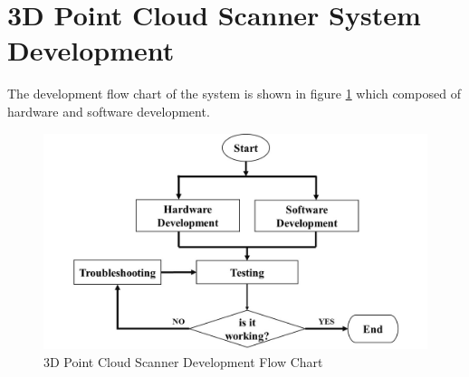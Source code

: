 \section{3D Point Cloud Scanner System Development}

The development flow chart of the system is shown in figure \ref{ch3:fig:3d-pcss_development_flow_chart} which composed of hardware and software development.


\begin{figure}[H]
	\centering
	\includegraphics[width=1\textwidth]{Figures/hardware_flowchart}
	\caption{3D Point Cloud Scanner Development Flow Chart}
	\label{ch3:fig:3d-pcss_development_flow_chart}
\end{figure}


